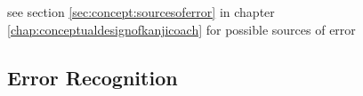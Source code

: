   


    

    
    



see section \ref{sec:concept:sourcesoferror} in chapter 
\ref{chap:conceptualdesignofkanjicoach} for possible sources of error

\subsection{Error Recognition}
\label{sec:hwre:errorrecognition}

